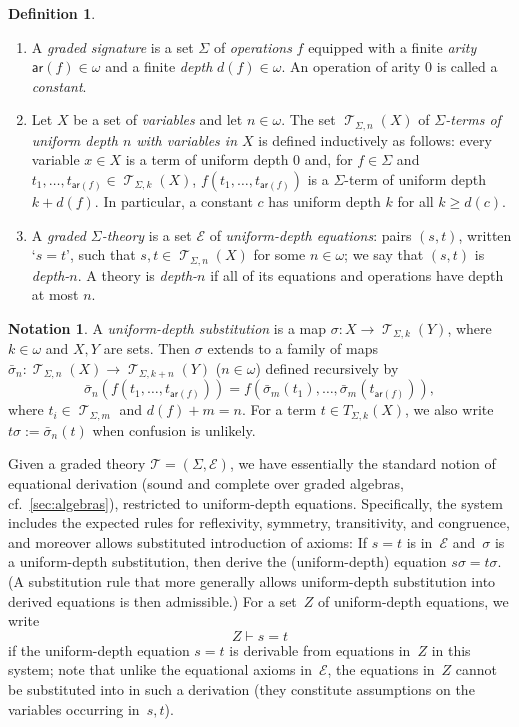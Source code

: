 \documentclass[sigconf,
			final%
			nonacm
                        ]{acmart}
\numberwithin{equation}{section}
\numberwithin{equation}{section}
\theoremstyle{plain}
\theoremstyle{definition}
\newtheorem{defn}[thm]{Definition}
\newtheorem{notn}[thm]{Notation}
\newcommand{\T}{\mathcal{T}}                     %
\newcommand{\arity}{\mathsf{ar}}
\DeclareMathOperator{\Terms}{\mathscr{T}}
\newcommand{\Termsarg}[1]{\Terms_{\!#1}}
\newcommand{\E}{\mathcal{E}}   %
\begin{document}
\begin{defn}\label{def:theory}
\begin{enumerate}
\item A \emph{graded signature} is a set $\Sigma$ of \emph{operations}
  $f$ equipped with a finite \emph{arity} $\arity(f) \in \omega$ and a
  finite \emph{depth} $d(f)\in\omega.$ An operation of arity 0 is
  called a \emph{constant}.

\item
Let $X$ be a set of \emph{variables} and let
$n\in\omega$. The set $\Termsarg{\Sigma, n}(X)$
of \emph{$\Sigma$-terms of uniform depth $n$ with
variables in $X$} is defined inductively as follows:
every variable $x\in X$ is a term of uniform depth
$0$ and, for $f\in\Sigma$ and
$t_1,\dots, t_{\arity(f)}\in\Termsarg{\Sigma, k}(X)$,
$f(t_1,\dots, t_{\arity(f)})$ is a $\Sigma$-term
of uniform depth $k+ d(f)$. In particular,
a constant $c$ has uniform depth $k$ for all $k\geq d(c)$.
\item A \emph{graded $\Sigma$-theory} is a set $\E$ of
  \emph{uniform-depth equations}: pairs $(s, t)$, written `$s=t$',
  such that $s,t\in\Termsarg{\Sigma, n}(X)$ for some $n\in\omega$;
  we say that $(s, t)$ is \emph{depth-$n$}.
  A theory is \emph{depth-$n$} if all of its equations and
  operations have depth at most $n$.
\end{enumerate}
\end{defn}

\begin{notn}\label{N:substitution}
A \emph{uniform-depth substitution} is a map
$\sigma\colon X\to\Termsarg{\Sigma, k}(Y)$,
where $k\in\omega$ and $X, Y$ are sets.
Then $\sigma$ extends to a family of maps
$\bar{\sigma}_n\colon\Termsarg{\Sigma, n}(X)\to\Termsarg{\Sigma, k+n}(Y)$
($n\in\omega$) defined recursively by
\[
\bar{\sigma}_n(f(t_1,\dots, t_{\arity(f)})) =
f(\bar{\sigma}_m(t_1),\dots, \bar{\sigma}_m(t_{\arity(f)})),
\]
where $t_i\in\Termsarg{\Sigma, m}$ and
$d(f)+m = n$. For a term $t\in T_{\Sigma, k}(X)$,
we also write $t\sigma:= \bar{\sigma}_n(t)$ when
confusion is unlikely.
\end{notn}
\noindent
Given a graded theory $\T=(\Sigma, \E)$, we have essentially the
standard notion of equational derivation (sound and complete over
graded algebras, cf.\ \cref{sec:algebras}), restricted to
uniform-depth equations. Specifically, the system includes the
expected rules for reflexivity, symmetry, transitivity, and
congruence, and moreover allows substituted introduction of axioms: If
$s=t$ is in~$\E$ and~$\sigma$ is a uniform-depth substitution, then
derive the (uniform-depth) equation $s\sigma=t\sigma$. (A substitution
rule that more generally allows uniform-depth substitution into
derived equations is then admissible.)  For a set~$Z$ of uniform-depth
equations, we write
\begin{equation*}
Z\vdash s=t
\end{equation*}
if the uniform-depth equation $s=t$ is derivable from equations in~$Z$
in this system; note that unlike the equational axioms in~$\E$, the
equations in~$Z$ cannot be substituted into in such a derivation (they
constitute assumptions on the variables occurring in~$s,t$).
\end{document}
